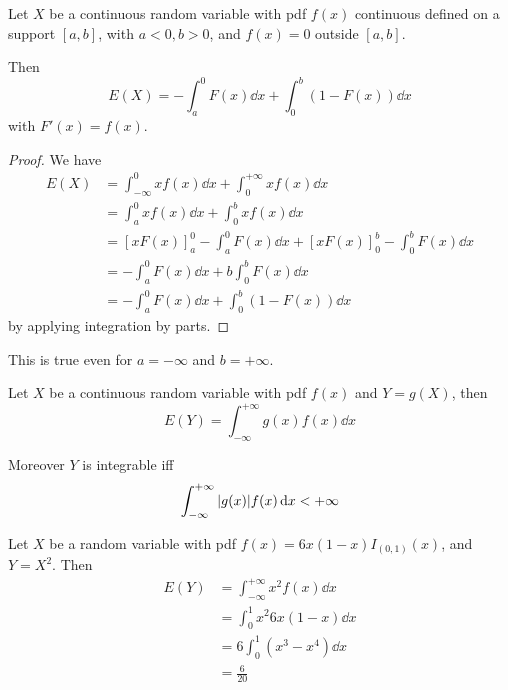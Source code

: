 \documentclass[12pt]{extarticle}
\begin{document}
\begin{theorem}
    Let $X$ be a continuous random variable with pdf $f(x)$ continuous defined on a support $[a, b]$, with $a < 0, b > 0$, and $f(x) = 0$ outside $[a, b]$.

    Then
    \begin{equation}
        E(X) = -\int_{a}^0 F(x) \dd{x} + \int_0^b (1 - F(x)) \dd{x}
    \end{equation}
    with $F'(x) = f(x)$.
\end{theorem}

\begin{proof}
    We have
    \begin{align}
        E(X) & = \int_{-\infty}^0 x f(x) \dd{x} + \int_0^{+\infty} x f(x) \dd{x}           \\
             & = \int_{a}^0 x f(x) \dd{x} + \int_0^{b} x f(x) \dd{x}                       \\
             & = [x F(x)]_a^0 - \int_a^0 F(x) \dd{x} + [x F(x)]_0^b - \int_0^b F(x) \dd{x} \\
             & = -\int_a^0 F(x) \dd{x} + b \int_0^b F(x) \dd{x}                            \\
             & = -\int_a^0 F(x) \dd{x} + \int_0^b (1-F(x)) \dd{x}
    \end{align}
    by applying integration by parts.
\end{proof}

\begin{remark}
    This is true even for $a = -\infty$ and $b = +\infty$.
\end{remark}

\begin{proposition}
    Let $X$ be a continuous random variable with pdf $f(x)$ and $Y = g(X)$, then
    \begin{equation}
        E(Y) = \int_{-\infty}^{+\infty} g(x) f(x) \dd{x}
    \end{equation}

    Moreover $Y$ is integrable iff
    \begin{equation}
        \int_{-\infty}^{+\infty} \abs{g(x)} f(x) \dd{x} < +\infty
    \end{equation}
\end{proposition}

\begin{example}
    Let $X$ be a random variable with pdf $f(x) = 6x(1-x) I_{(0, 1)}(x)$, and $Y = X^2$.
    Then
    \begin{align}
        E(Y) & = \int_{-\infty}^{+\infty} x^2 f(x) \dd{x} \\
             & = \int_0^1 x^2 6x(1-x) \dd{x}              \\
             & = 6 \int_0^1 (x^3 - x^4) \dd{x}            \\
             & = \frac{6}{20}
    \end{align}
\end{example}
\end{document}
